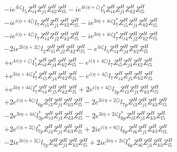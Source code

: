 \begin{align}
 &-i e^{4 i \zeta } l_5 Z_{{i 4}}^{H} Z_{{j 1}}^{H} Z_{{k 2}}^{H} Z_{{l 5}}^{H} -i e^{4 i \Big(\eta +\zeta \Big)} l_5^* Z_{{i 4}}^{H} Z_{{j 1}}^{H} Z_{{k 2}}^{H} Z_{{l 5}}^{H} \nonumber \\ 
 &-i e^{i \Big(\eta +4 \zeta \Big)} l_7 Z_{{i 5}}^{H} Z_{{j 1}}^{H} Z_{{k 2}}^{H} Z_{{l 5}}^{H} -i e^{3 i \eta +4 i \zeta } l_7^* Z_{{i 5}}^{H} Z_{{j 1}}^{H} Z_{{k 2}}^{H} Z_{{l 5}}^{H} \nonumber \\ 
 &-i e^{i \Big(\eta +4 \zeta \Big)} l_7 Z_{{i 4}}^{H} Z_{{j 2}}^{H} Z_{{k 2}}^{H} Z_{{l 5}}^{H} -i e^{3 i \eta +4 i \zeta } l_7^* Z_{{i 4}}^{H} Z_{{j 2}}^{H} Z_{{k 2}}^{H} Z_{{l 5}}^{H} \nonumber \\ 
 &-2 i e^{2 i \Big(\eta +2 \zeta \Big)} l_2 Z_{{i 5}}^{H} Z_{{j 2}}^{H} Z_{{k 2}}^{H} Z_{{l 5}}^{H} - e^{4 i \zeta } l_5 Z_{{i 4}}^{H} Z_{{j 4}}^{H} Z_{{k 2}}^{H} Z_{{l 5}}^{H} \nonumber \\ 
 &+e^{4 i \Big(\eta +\zeta \Big)} l_5^* Z_{{i 4}}^{H} Z_{{j 4}}^{H} Z_{{k 2}}^{H} Z_{{l 5}}^{H} - e^{i \Big(\eta +4 \zeta \Big)} l_7 Z_{{i 5}}^{H} Z_{{j 4}}^{H} Z_{{k 2}}^{H} Z_{{l 5}}^{H} \nonumber \\ 
 &+e^{3 i \eta +4 i \zeta } l_7^* Z_{{i 5}}^{H} Z_{{j 4}}^{H} Z_{{k 2}}^{H} Z_{{l 5}}^{H} - e^{i \Big(\eta +4 \zeta \Big)} l_7 Z_{{i 4}}^{H} Z_{{j 5}}^{H} Z_{{k 2}}^{H} Z_{{l 5}}^{H} \nonumber \\ 
 &+e^{3 i \eta +4 i \zeta } l_7^* Z_{{i 4}}^{H} Z_{{j 5}}^{H} Z_{{k 2}}^{H} Z_{{l 5}}^{H} +2 e^{i \Big(\eta +4 \zeta \Big)} l_{3p} Z_{{i 3}}^{H} Z_{{j 1}}^{H} Z_{{k 3}}^{H} Z_{{l 5}}^{H} \nonumber \\ 
 &+2 e^{i \Big(\eta +6 \zeta \Big)} l_{6p} Z_{{i 3}}^{H} Z_{{j 1}}^{H} Z_{{k 3}}^{H} Z_{{l 5}}^{H} -2 e^{3 i \Big(\eta +2 \zeta \Big)} l_{7p} Z_{{i 3}}^{H} Z_{{j 1}}^{H} Z_{{k 3}}^{H} Z_{{l 5}}^{H} \nonumber \\ 
 &-2 e^{3 i \eta +4 i \zeta } l_{3p}^* Z_{{i 3}}^{H} Z_{{j 1}}^{H} Z_{{k 3}}^{H} Z_{{l 5}}^{H} -2 e^{3 i \eta +2 i \zeta } l_{6p}^* Z_{{i 3}}^{H} Z_{{j 1}}^{H} Z_{{k 3}}^{H} Z_{{l 5}}^{H} \nonumber \\ 
 &+2 e^{i \Big(\eta +2 \zeta \Big)} l_{7p}^* Z_{{i 3}}^{H} Z_{{j 1}}^{H} Z_{{k 3}}^{H} Z_{{l 5}}^{H} +2 i e^{i \Big(\eta +6 \zeta \Big)} l_{6p} Z_{{i 6}}^{H} Z_{{j 1}}^{H} Z_{{k 3}}^{H} Z_{{l 5}}^{H} \nonumber \\ 
 &-2 i e^{3 i \Big(\eta +2 \zeta \Big)} l_{7p} Z_{{i 6}}^{H} Z_{{j 1}}^{H} Z_{{k 3}}^{H} Z_{{l 5}}^{H} +2 i e^{3 i \eta +2 i \zeta } l_{6p}^* Z_{{i 6}}^{H} Z_{{j 1}}^{H} Z_{{k 3}}^{H} Z_{{l 5}}^{H} \nonumber \\ 

\end{align}
